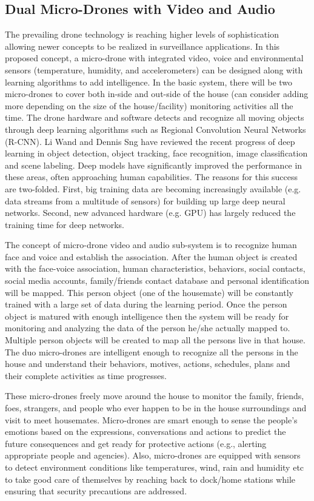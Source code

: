 \documentclass[sigconf]{acmart}
\begin{document}
\subsection{Dual Micro-Drones with Video and Audio}
The prevailing drone technology is reaching higher levels of sophistication allowing newer concepts to be realized in surveillance applications. In this proposed concept, a micro-drone with integrated video, voice and environmental sensors (temperature, humidity, and accelerometers) can be designed along with learning algorithms to add intelligence. In the basic system, there will be two micro-drones to cover both in-side and out-side of the house (can consider adding more depending on the size of the house/facility) monitoring activities all the time. The drone hardware and software detects and recognize all moving objects through deep learning algorithms such as Regional Convolution Neural Networks (R-CNN). Li Wand and Dennis Sng\cite{Wang2015} have reviewed the recent progress of deep learning in object detection, object tracking, face recognition, image classification and scene labeling. Deep models have significantly improved the performance in these areas, often approaching human capabilities. The reasons for this success are two-folded. First, big training data are becoming increasingly available (e.g. data streams from a multitude of sensors) for building up large deep neural networks. Second, new advanced hardware (e.g. GPU) has largely reduced the training time for deep networks. 

The concept of micro-drone video and audio sub-system is to recognize human face and voice and establish the association. After the human object is created with the face-voice association, human characteristics, behaviors, social contacts, social media accounts, family/friends contact database and personal identification will be mapped. This person object (one of the housemate) will be constantly trained with a large set of data during the learning period. Once the person object is matured with enough intelligence then the system will be ready for monitoring and analyzing the data of the person he/she actually mapped to. Multiple person objects will be created to map all the persons live in that house. The duo micro-drones are intelligent enough to recognize all the persons in the house and understand their behaviors, motives, actions, schedules, plans and their complete activities as time progresses.  

These micro-drones freely move around the house to monitor the family, friends, foes, strangers, and people who ever happen to be in the house surroundings and visit to meet housemates. Micro-drones are smart enough to sense the people's emotions based on the expressions, conversations and actions to predict the future consequences and get ready for protective actions (e.g., alerting appropriate people and agencies). Also, micro-drones are equipped with sensors to detect environment conditions like temperatures, wind, rain and humidity etc to take good care of themselves by reaching back to dock/home stations while ensuring that security precautions are addressed. 
\end{document}
